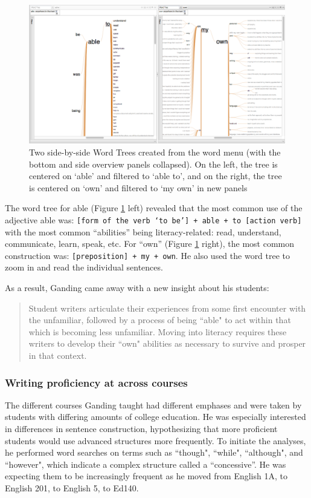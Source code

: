 \documentclass{sig-alternate}
\newcommand{\code}[1] {\texttt{#1}}
\begin{document}
\begin{figure}[h!]
\includegraphics[width=\textwidth]{fig/rex/04.png}
\caption{ Two side-by-side Word Trees created from the word menu (with the bottom and side overview panels collapsed). On the left, the tree is centered on `able' and filtered to `able to', and on the right, the tree is centered on  `own' and filtered to `my own' in new panels \label{fig:rex04}}
\end{figure}

The word tree for able (Figure \ref{fig:rex04} left) revealed that the most common use of the adjective able was: \code{[form of the verb `to be'] + able + to [action verb]} with the most common ``abilities'' being literacy-related: read, understand, communicate, learn, speak, etc.  For ``own'' (Figure \ref{fig:rex04} right), the most common construction was: \code{[preposition] + my + own}.  He also used the word tree to zoom in and read the individual sentences.

As a result, Ganding came away with a new insight about his students:
\begin{quote}
Student writers articulate their experiences from some first encounter with the unfamiliar, followed by a process of being ``able" to act within that which is becoming less unfamiliar.  Moving into literacy requires these writers to develop their ``own" abilities as necessary to survive and prosper in that context.
\end{quote} 

\subsubsection{Writing proficiency at across courses}
The different courses Ganding taught had different emphases and were taken by students with differing amounts of college education. He was especially interested in differences in sentence construction, hypothesizing that more proficient students would use advanced structures more frequently. To initiate the analyses, he performed word searches on terms such as ``though", ``while", ``although", and ``however", which indicate a complex structure called a ``concessive''. He was expecting them to be increasingly frequent as he moved from English 1A, to English 201, to English 5, to Ed140.
\end{document}
